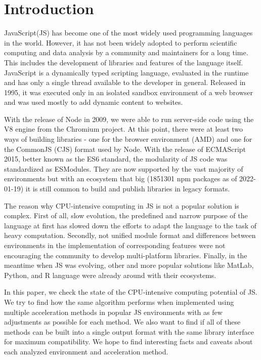 \section{Introduction}\label{sec:introduction}
JavaScript(JS) has become one of the most widely used programming languages in the world. However, it has not been widely adopted to perform scientific computing and data analysis by a community and maintainers for a long time. This includes the development of libraries and features of the language itself. JavaScript is a dynamically typed scripting language, evaluated in the runtime and has only a single thread available to the developer in general. Released in 1995, it was executed only in an isolated sandbox environment of a web browser and was used mostly to add dynamic content to websites.

With the release of Node in 2009, we were able to run server-side code using the V8 engine from the Chromium project. At this point, there were at least two ways of building libraries - one for the browser environment (AMD) and one for the CommonJS (CJS) format used by Node. With the release of ECMAScript 2015, better known as the ES6 standard, the modularity of JS code was standardized as ESModules. They are now supported by the vast majority of environments but with an ecosystem that big (1851301 npm packages as of 2022-01-19) it is still common to build and publish libraries in legacy formats.

The reason why CPU-intensive computing in JS is not a popular solution is complex. First of all, slow evolution, the predefined and narrow purpose of the language at first has slowed down the efforts to adapt the language to the task of heavy computation. Secondly, not unified module format and differences between environments in the implementation of corresponding features were not encouraging the community to develop multi-platform libraries. Finally, in the meantime when JS was evolving, other and more popular solutions like MatLab, Python, and R language were already around with their ecosystems.

In this paper, we check the state of the CPU-intensive computing potential of JS. We try to find how the same algorithm performs when implemented using multiple acceleration methods in popular JS environments with as few adjustments as possible for each method. We also want to find if all of these methods can be built into a single output format with the same library interface for maximum compatibility. We hope to find interesting facts and caveats about each analyzed environment and acceleration method.

